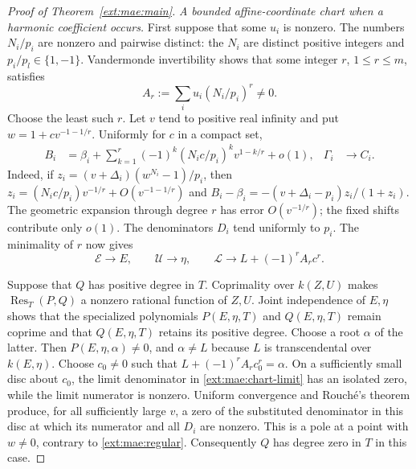 \documentclass[11pt,a4paper]{article}
\theoremstyle{definition}\newtheorem{definition}[theorem]{Definition}
\theoremstyle{remark}\newtheorem{remark}[theorem]{Remark}
\begin{document}
\begin{proof}[Proof of Theorem~\ref{ext:mae:main}]
\emph{A bounded affine-coordinate chart when a harmonic coefficient occurs.}
First suppose that some $u_i$ is nonzero.
The numbers $N_i/p_i$ are nonzero and pairwise distinct: the $N_i$ are
distinct positive integers and $p_i/p_l\in\{1,-1\}$.
Vandermonde invertibility shows that some integer $r$, $1\le r\le m$,
satisfies
\[
              A_r:=\sum_i u_i(N_i/p_i)^r\ne0.
\]
Choose the least such $r$.  Let $v$ tend to positive real infinity and
put $w=1+c v^{-1-1/r}$.  Uniformly for $c$ in a compact set,
\begin{align}
 B_i&=\beta_i+
       \sum_{k=1}^{r}(-1)^k(N_i c/p_i)^k v^{1-k/r}+o(1),
 &\Gamma_i&\longrightarrow C_i.
 \label{ext:mae:chart}
\end{align}
Indeed, if $z_i=(v+\Delta_i)(w^{N_i}-1)/p_i$, then
$z_i=(N_i c/p_i)v^{-1/r}+O(v^{-1-1/r})$ and
$B_i-\beta_i=-(v+\Delta_i-p_i)z_i/(1+z_i)$.
The geometric expansion through degree $r$ has error $O(v^{-1/r})$;
the fixed shifts contribute only $o(1)$.  The denominators $D_i$ tend
uniformly to $p_i$.  The minimality of $r$ now gives
\begin{equation}
 \mathcal E\longrightarrow E,\qquad
 \mathcal U\longrightarrow\eta,\qquad
 \mathcal L\longrightarrow L+(-1)^r A_r c^r.
 \label{ext:mae:chart-limit}
\end{equation}

Suppose that $Q$ has positive degree in $T$.  Coprimality over
$k(Z,U)$ makes $\operatorname{Res}_T(P,Q)$ a nonzero rational function
of $Z,U$.  Joint independence of $E,\eta$ shows that the specialized
polynomials $P(E,\eta,T)$ and $Q(E,\eta,T)$ remain coprime and that
$Q(E,\eta,T)$ retains its positive degree.  Choose a root $\alpha$
of the latter.  Then $P(E,\eta,\alpha)\ne0$, and $\alpha\ne L$
because $L$ is transcendental over $k(E,\eta)$.
Choose $c_0\ne0$ such that
$L+(-1)^r A_r c_0^r=\alpha$.  On a sufficiently small disc about
$c_0$, the limit denominator in \eqref{ext:mae:chart-limit} has an isolated
zero, while the limit numerator is nonzero.  Uniform convergence and
Rouch\'e's theorem produce, for all sufficiently large $v$, a zero
of the substituted denominator in this disc at which its numerator
and all $D_i$ are nonzero.  This is a pole at a point with $w\ne0$,
contrary to \eqref{ext:mae:regular}.  Consequently $Q$ has degree zero in $T$
in this case.


\end{proof}
\end{document}

